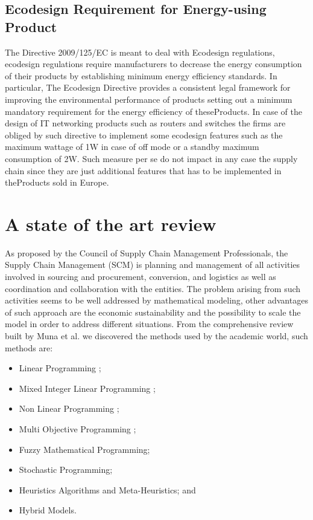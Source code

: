 \documentclass{article}
\begin{document}
\subsection{Ecodesign Requirement for Energy-using Product}
  The Directive 2009/125/EC is meant to deal with Ecodesign regulations, ecodesign regulations require manufacturers to decrease the energy consumption of their products by establishing minimum energy efficiency standards. In particular, The Ecodesign Directive provides a consistent legal framework for improving the environmental performance of products setting out a minimum mandatory requirement for the energy efficiency of theseProducts. In case of the design of IT networking products such as routers and switches the firms are obliged by such directive to implement some ecodesign features such as the maximum wattage of 1W in case of off mode or a standby maximum consumption of 2W. Such measure per se do not impact in any case the supply chain since they are just additional features that has to be implemented in theProducts sold in Europe.

\section{A state of the art review }
  As proposed by the Council of Supply Chain Management Professionals, the Supply Chain Management (SCM) is planning and management of all activities involved in sourcing and procurement, conversion, and logistics as well as coordination and collaboration with the entities. The problem arising from such activities seems to be well addressed by mathematical modeling, other advantages of such approach are the economic sustainability and the possibility to scale the model in order to address different situations.
  From the comprehensive review built by Muna et al. \cite{mula_mathematical_2010} we discovered the methods used by the academic world, such methods are:
  \begin{itemize}
    \item Linear Programming \cite{jung_order_2008};
    \item Mixed Integer Linear Programming \cite{romo_optimizing_2009};
    \item Non Linear Programming \cite{benjamin_analysis_1989};
    \item Multi Objective Programming \cite{torabi_interactive_2008};
    \item Fuzzy Mathematical Programming;
    \item Stochastic Programming;
    \item Heuristics Algorithms and Meta-Heuristics; and
    \item Hybrid Models.
  \end{itemize}
\end{document}

